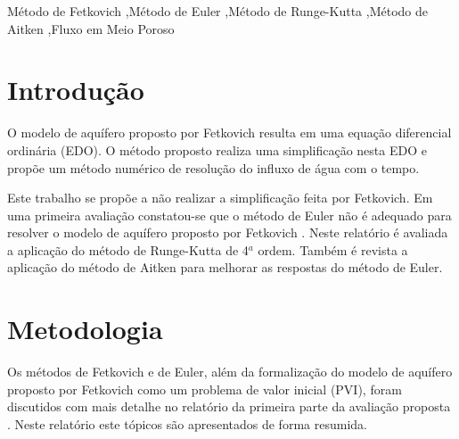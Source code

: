 \documentclass[final,5p]{elsarticle}
\numberwithin{equation}{section}
\begin{document}
\begin{frontmatter}
\begin{abstract}
\end{abstract}




\begin{keyword}
    Método de Fetkovich \sep Método de Euler \sep Método de Runge-Kutta \sep Método de Aitken \sep Fluxo em Meio Poroso



\end{keyword}

\end{frontmatter}


\section{Introdução}

    O modelo de aquífero proposto por Fetkovich resulta em uma equação diferencial ordinária (EDO). O método proposto realiza uma simplificação nesta EDO e propõe um método numérico de resolução do influxo de água com o tempo.

    Este trabalho se propõe a não realizar a simplificação feita por Fetkovich. Em uma primeira avaliação constatou-se que o método de Euler não é adequado para resolver o modelo de aquífero proposto por Fetkovich \cite{relatorioeuler}. Neste relatório é avaliada a aplicação do método de Runge-Kutta de 4$^a$ ordem. Também é revista a aplicação do método de Aitken para melhorar as respostas do método de Euler.

\section{Metodologia}

        Os métodos de Fetkovich e de Euler, além da formalização do modelo de aquífero proposto por Fetkovich como um problema de valor inicial (PVI), foram discutidos com mais detalhe no relatório da primeira parte da avaliação proposta \cite{relatorioeuler}. Neste relatório este tópicos são apresentados de forma resumida.
\end{document}
